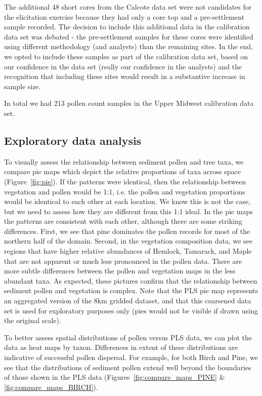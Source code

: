 \documentclass[12pt]{article}
\begin{document}
The additional 48 short cores from the Calcote data set were not
candidates for the elicitation exercise because they had only a core
top and a pre-settlement sample recorded. The decision to include this
additional data in the calibration data set was debated - the
pre-settlement samples for these cores were identified using different
methodology (and analysts) than the remaining sites. In the end, we
opted to include these samples as part of the calibration data set,
based on our confidence in the data set (really our confidence in
the analysts) and the recognition that including these sites would
result in a substantive increase in sample size.

In total we had 213 pollen count samples in the Upper Midwest
calibration data set.

\subsection{Exploratory data analysis}

To visually assess the relationship between sediment pollen and tree
taxa, we compare pie maps which depict the relative proportions of
taxa across space (Figure~\ref{fig:pie}). If the patterns were
identical, then the relationship between vegetation and pollen would
be 1:1, i.e. the pollen and vegetation proportions would be identical
to each other at each location. We know this is not the case, but we
need to assess how they are different from this 1:1 ideal. In the pie
maps the patterns are consistent with each other, although there are
some striking differences. First, we see that pine dominates the
pollen records for most of the northern half of the domain. Second, in
the vegetation composition data, we see regions that have higher
relative abundances of Hemlock, Tamarack, and Maple that are not
apparent or much less pronounced in the pollen data. There are more
subtle differences between the pollen and vegetation maps in the less
abundant taxa. As expected, these pictures confirm that the
relationship between sediment pollen and vegetation is complex. Note
that the PLS pie map represents an aggregated version of the 8km
gridded dataset, and that this coarsened data set is used for
exploratory purposes only (pies would not be visible if drawn using
the original scale).

To better assess spatial distributions of pollen versus PLS data, we
can plot the data as heat maps by taxon. Differences in extent of these
distributions are indicative of successful pollen dispersal. For
example, for both Birch and Pine, we see that the distributions of
sediment pollen extend well beyond the boundaries of those shown in the PLS
data (Figures~\ref{fig:compare_maps_PINE} \& \ref{fig:compare_maps_BIRCH}). 
\end{document}
